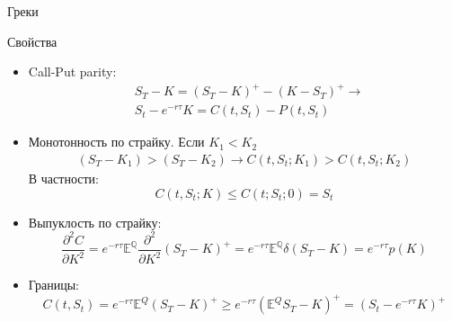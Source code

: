 \documentclass[aspectratio=169]{beamer}
\begin{document}
\begin{frame}{Греки}
\end{frame}

\begin{frame}{Свойства}
    \begin{itemize}
        \item<1-> Call-Put parity:
        \begin{align*}
            &S_T - K = (S_T - K)^+ - (K - S_T)^+ \to \\
            &S_t - e^{-r \tau} K = C(t, S_t) - P(t, S_t)
        \end{align*}

        \item<2-> Монотонность по страйку. Если $K_1 < K_2$
        \begin{align*}
               (S_T - K_1) > (S_T - K_2) \to C(t, S_t; K_1) > C(t, S_t; K_2) 
        \end{align*}В частности:
        $$
            C(t, S_t; K) \leq C(t; S_t; 0) = S_t
        $$

        \item<3-> Выпуклость по страйку:
        $$
            \dfrac{\partial^2 C}{\partial K^2} = e^{-r\tau} \mathbb{E}^{\mathbb{Q}} \dfrac{\partial^2}{\partial K^2} (S_T - K)^+ =
            e^{-r\tau} \mathbb{E}^{\mathbb{Q}} \delta(S_T - K) = e^{-r\tau} p(K)
        $$

        \item<4-> Границы:
        $$
            C(t, S_t) = e^{-r\tau}\mathbb{E}^Q (S_T - K)^+ \geq e^{-r\tau} (\mathbb{E}^Q S_T - K)^+ = (S_t - e^{-r\tau} K)^+
        $$
    \end{itemize}    
\end{frame}
\end{document}
